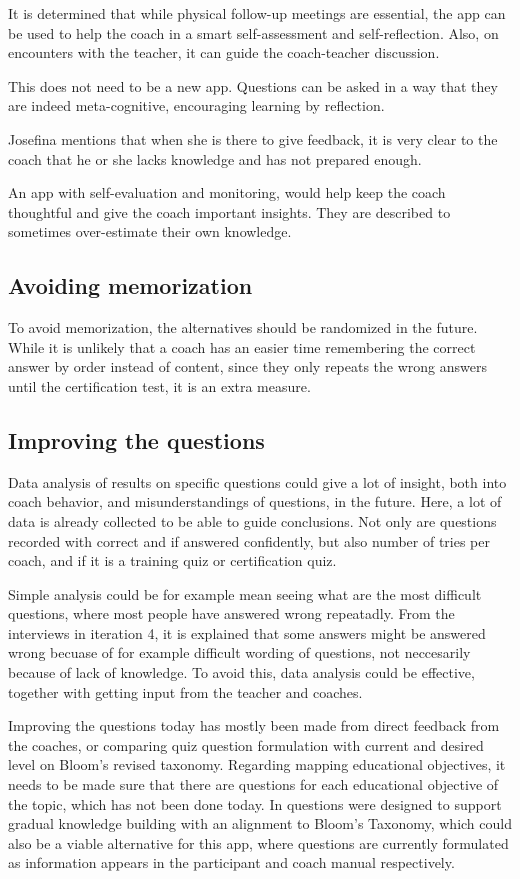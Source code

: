 It is determined that while physical follow-up meetings are essential, the app can be used to help the coach in a smart self-assessment and self-reflection. Also, on encounters with the teacher, it can guide the coach-teacher discussion.

This does not need to be a new app. Questions can be asked in a way that they are indeed meta-cognitive, encouraging learning by reflection.

Josefina mentions that when she is there to give feedback, it is very clear to the coach that he or she lacks knowledge and has not prepared enough.

An app with self-evaluation and monitoring, would help keep the coach thoughtful and give the coach important insights. They are described to sometimes over-estimate their own knowledge.

\subsection{Avoiding memorization}
To avoid memorization, the alternatives should be randomized in the future. While it is unlikely that a coach has an easier time remembering the correct answer by order instead of content, since they only repeats the wrong answers until the certification test, it is an extra measure.

\subsection{Improving the questions}
Data analysis of results on specific questions could give a lot of insight, both into coach behavior, and misunderstandings of questions, in the future. Here, a lot of data is already collected to be able to guide conclusions. Not only are questions recorded with correct and if answered confidently, but also number of tries per coach, and if it is a training quiz or certification quiz.

Simple analysis could be for example mean seeing what are the most difficult questions, where most people have answered wrong repeatadly. From the interviews in iteration 4, it is explained that some answers might be answered wrong becuase of for example difficult wording of questions, not neccesarily because of lack of knowledge. To avoid this, data analysis could be effective, together with getting input from the teacher and coaches.

Improving the questions today has mostly been made from direct feedback from the coaches, or comparing quiz question formulation with current and desired level on Bloom's revised taxonomy. Regarding mapping educational objectives, it needs to be made sure that there are questions for each educational objective of the topic, which has not been done today. In \cite{yengin} questions were designed to support gradual knowledge building with an alignment to Bloom’s Taxonomy, which could also be a viable alternative for this app, where questions are currently formulated as information appears in the participant and coach manual respectively.
